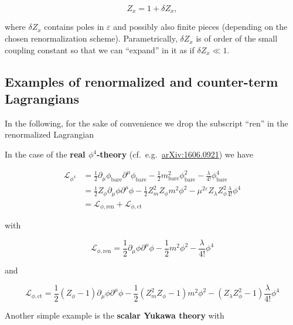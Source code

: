 \documentclass[../FeynCalcManual.tex]{subfiles}
\begin{document}
\begin{equation}
Z_x = 1 + \delta Z_x,
\end{equation}

where \(\delta Z_x\) contains poles in \(\varepsilon\) and possibly also
finite pieces (depending on the chosen renormalization scheme).
Parametrically, \(\delta Z_x\) is of order of the small coupling
constant so that we can ``expand'' in it as if \(\delta Z_x \ll 1\).

\subsection{Examples of renormalized and counter-term
Lagrangians}\label{examples-of-renormalized-and-counter-term-lagrangians}

In the following, for the sake of convenience we drop the subscript
``ren'' in the renormalized Lagrangian

In the case of the \textbf{real \(\phi^4\)-theory}
(cf.~e.g.~\href{https://arxiv.org/pdf/1606.09210.pdf}{arXiv:1606.0921})
we have

\begin{align*}
\mathcal{L}_{\phi^4} &= \frac{1}{2} \partial_\mu \phi_{\textrm{bare}} \partial^\mu \phi_{\textrm{bare}} - \frac{1}{2} m_{\textrm{bare}}^2 \phi_{\textrm{bare}}^2 - \frac{\lambda}{4!} \phi_{\textrm{bare}}^4 \\
& = \frac{1}{2} Z_\phi \partial_\mu \phi \partial^\mu \phi - \frac{1}{2} Z_m^2 Z_\phi m^2 \phi^2 - \mu^{2 \varepsilon} Z_\lambda Z_\phi^2 \frac{\lambda}{4!} \phi^4 \\
 & = \mathcal{L}_{\phi,\textrm{ren}} + \mathcal{L}_{\phi,\textrm{ct}}
\end{align*}

with

\begin{equation}
\mathcal{L}_{\phi,{\textrm{ren}}} = \frac{1}{2} \partial_\mu \phi \partial^\mu \phi - \frac{1}{2} m^2 \phi^2 - \frac{\lambda}{4!} \phi^4
\end{equation}

and

\begin{equation}
\mathcal{L}_{\phi,{\textrm{ct}}} = \frac{1}{2} (Z_\phi - 1) \partial_\mu \phi \partial^\mu \phi - \frac{1}{2} (Z_m^2 Z_\phi - 1) m^2 \phi^2 - (Z_\lambda Z_\phi^2 - 1) \frac{\lambda}{4!} \phi^4
\end{equation}

Another simple example is the \textbf{scalar Yukawa theory} with
\end{document}

